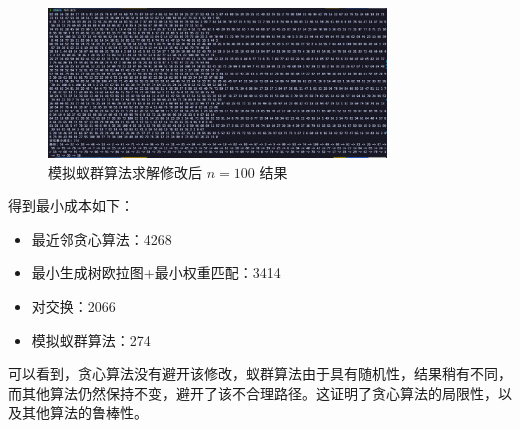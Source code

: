 \begin{figure}[htbp]
    \centering
    \includegraphics[width=0.8\textwidth]{images/aco_bad.png}
    \caption{模拟蚁群算法求解修改后 $n=100$ 结果}
    \label{fig:ant-bad}
\end{figure}

得到最小成本如下：\begin{itemize}
    \item 最近邻贪心算法：4268
    \item 最小生成树欧拉图+最小权重匹配：3414
    \item 对交换：2066
    \item 模拟蚁群算法：274
\end{itemize}

可以看到，贪心算法没有避开该修改，蚁群算法由于具有随机性，结果稍有不同，而其他算法仍然保持不变，避开了该不合理路径。这证明了贪心算法的局限性，以及其他算法的鲁棒性。

